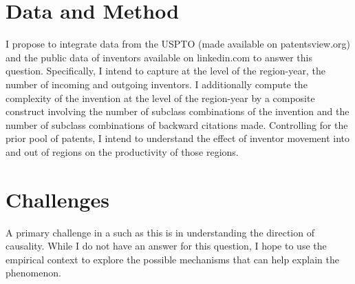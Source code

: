 \documentclass[12pt]{article}
\begin{document}
\section{Data and Method}
I propose to integrate data from the USPTO (made available on patentsview.org) and the public data of inventors available on linkedin.com to answer this question. Specifically, I intend to capture at the level of the region-year, the number of incoming and outgoing inventors. I additionally compute the complexity of the invention at the level of the region-year by a composite construct involving the number of subclass combinations of the invention  and the number of subclass combinations of backward citations made. Controlling for the prior pool of patents, I intend to understand the effect of inventor movement into and out of regions on the productivity of those regions.

\section{Challenges}
A primary challenge in a such as this is in understanding the direction of causality. While I do not have an answer for this question, I hope to use the empirical context to explore the possible mechanisms that can help explain the phenomenon.

 

\end{document}
